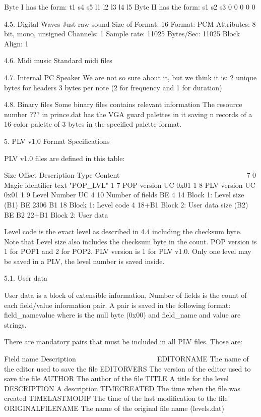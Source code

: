  Byte I  has the form: t1 s4 s5 l1 l2 l3 l4 l5
 Byte II has the form: s1 s2 s3  0  0  0  0  0

4.5. Digital Waves
Just raw sound
 Size of Format: 16
 Format: PCM
 Attributes: 8 bit, mono, unsigned
 Channels: 1
 Sample rate: 11025
 Bytes/Sec: 11025
 Block Align: 1
 
4.6. Midi music
 Standard midi files

4.7. Internal PC Speaker
 We are not so sure about it, but we think it is:
  2 unique bytes for headers
  3 bytes per note (2 for frequency and 1 for duration)
 
4.8. Binary files
 Some binary files contains relevant information
 The resource number ??? in prince.dat has the VGA guard palettes in it
 saving n records of a 16-color-palette of 3 bytes in the specified palette
 format.

5. PLV v1.0 Format Specifications

 PLV v1.0 files are defined in this table:

	Size  Offset Description                  Type   Content
	~~~~  ~~~~~~ ~~~~~~~~~~~                  ~~~~   ~~~~~~~
	    7      0 Magic identifier             text   "POP_LVL"
	    1      7 POP version                  UC     0x01
	    1      8 PLV version                  UC     0x01
	    1      9 Level Number                 UC
	    4     10 Number of fields             BE
	    4     14 Block 1: Level size (B1)     BE     2306
	   B1     18 Block 1: Level code
	    4  18+B1 Block 2: User data size (B2) BE
	   B2  22+B1 Block 2: User data

 Level code is the exact level as described in 4.4 including the checksum
 byte. Note that Level size also includes the checksum byte in the count.
 POP version is 1 for POP1 and 2 for POP2.
 PLV version is 1 for PLV v1.0.
 Only one level may be saved in a PLV, the level number is saved inside.

5.1. User data

 User data is a block of extensible information, Number of fields is the
 count of each field/value information pair. A pair is saved in the
 following format:
  field_name\0value\0
 where \0 is the null byte (0x00) and field_name and value are strings.

 There are mandatory pairs that must be included in all PLV files.
 Those are:

  Field name          Description
	~~~~~~~~~~          ~~~~~~~~~~~
  EDITORNAME          The name of the editor used to save the file
	EDITORVERS          The version of the editor used to save the file
	AUTHOR              The author of the file
	TITLE               A title for the level
	DESCRIPTION         A description
	TIMECREATED         The time when the file was created
	TIMELASTMODIF       The time of the last modification to the file
	ORIGINALFILENAME    The name of the original file name (levels.dat)


